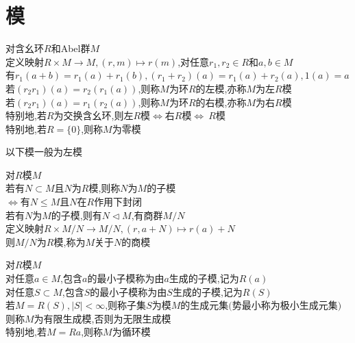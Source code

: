 

%

\setcounter{section}{0}
\setcounter{subsection}{0}

\chapter{模}

\begin{dingyi}
对含幺环$R$和Abel群$M$\\
定义映射$R\times M\to M,(r,m)\mapsto r(m)$,对任意$r_1,r_2\in R$和$a,b\in M$\\
有$r_1(a+b)=r_1(a)+r_1(b),(r_1+r_2)(a)=r_1(a)+r_2(a),1(a)=a$\\
若$(r_2r_1)(a)=r_2(r_1(a))$,则称$M$为环$R$的左模,亦称$M$为左$R$模\\
若$(r_2r_1)(a)=r_1(r_2(a))$,则称$M$为环$R$的右模,亦称$M$为右$R$模\\
特别地,若$R$为交换含幺环,则左$R$模$\Leftrightarrow$右$R$模$\Leftrightarrow \ R$模\\
特别地,若$R=\{0\}$,则称$M$为零模
\end{dingyi}

\begin{zhu}
以下模一般为左模
\end{zhu}

\begin{dingyi}
对$R$模$M$\\
若有$N\subset M$且$N$为$R$模,则称$N$为$M$的子模\\
$\Leftrightarrow$有$N\leq M$且$N$在$R$作用下封闭\\
若有$N$为$M$的子模,则有$N\lhd M$,有商群$M/N$\\
定义映射$R\times M/N\to M/N,(r,a+N)\mapsto r(a)+N$\\
则$M/N$为$R$模,称为$M$关于$N$的商模
\end{dingyi}

\begin{dingyi}
对$R$模$M$\\
对任意$a\in M$,包含$a$的最小子模称为由$a$生成的子模,记为$R(a)$\\
对任意$S\subset M$,包含$S$的最小子模称为由$S$生成的子模,记为$R(S)$\\
若$M=R(S),|S|<\infty$,则称子集$S$为模$M$的生成元集$($势最小称为极小生成元集$)$\\
则称$M$为有限生成模,否则为无限生成模\\
特别地,若$M=Ra$,则称$M$为循环模
\end{dingyi}

